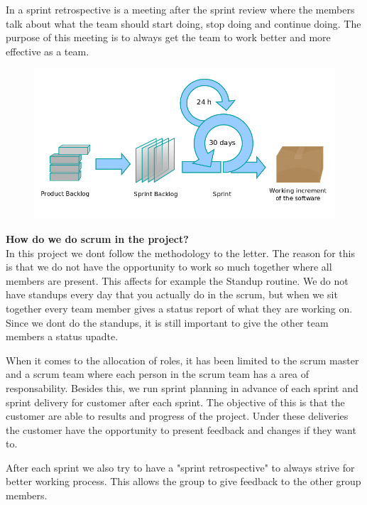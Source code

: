 In a sprint retrospective is a meeting after the sprint review where the members talk about what 
the team should start doing, stop doing and continue doing. The purpose of this meeting is to always 
get the team to work better and more effective as a team.

\begin{figure}[!ht]
    \includegraphics[scale=0.4]{pictures/Scrumprocess.png}
\end{figure}

{\bf How do we do scrum in the project?} \\
In this project we dont follow the methodology to the letter. The reason for this is that we do 
not have the opportunity to work so much together where all members are present. This affects
for example the Standup routine. We do not have standups every day that you actually do in the scrum,
but when we sit together every team member gives a status report of what they are working on. Since
we dont do the standups, it is still important to give the other team members a status upadte.

When it comes to the allocation of roles, it has been limited to the scrum master and a scrum 
team where each person in the scrum team has a area of responsability. Besides this, we run sprint 
planning in advance of each sprint and sprint delivery for customer 
after each sprint. The objective of this is that the customer are able to results and progress of 
the project. Under these deliveries the customer have the opportunity to present feedback and changes 
if they want to.

After each sprint we also try to have a "sprint retrospective" to always strive for better working 
process. This allows the group to give feedback to the other group members.

